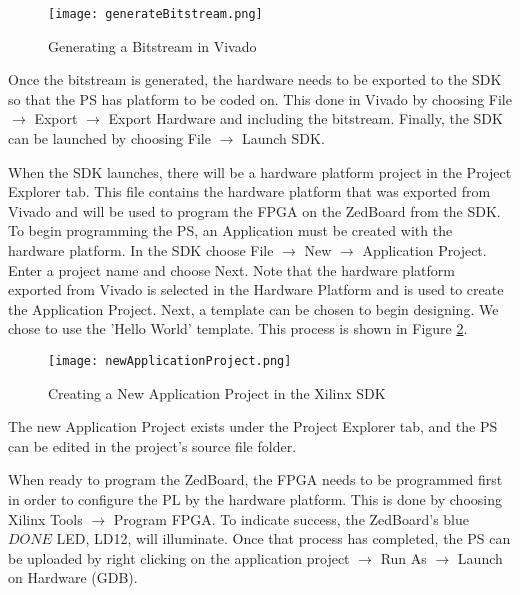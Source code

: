 \begin{figure}[H]
	\centerline{\texttt{[image: generateBitstream.png]}}
	\caption{Generating a Bitstream in Vivado}
	\label{generateBitstream}
\end{figure}

Once the bitstream is generated, the hardware needs to be exported to the SDK so that the PS has platform to be coded on. This done in Vivado by choosing File $\rightarrow$ Export $\rightarrow$ Export Hardware and including the bitstream. Finally, the SDK can be launched by choosing File $\rightarrow$ Launch SDK.
\par
When the SDK launches, there will be a hardware platform project in the Project Explorer tab. This file contains the hardware platform that was exported from Vivado and will be used to program the FPGA on the ZedBoard from the SDK. To begin programming the PS, an Application must be created with the hardware platform. In the SDK choose File $\rightarrow$ New $\rightarrow$ Application Project. Enter a project name and choose Next. Note that the hardware platform exported from Vivado is selected in the Hardware Platform and is used to create the Application Project. Next, a template can be chosen to begin designing. We chose to use the 'Hello World' template. This process is shown in Figure \ref{newApplicationProject}.

\begin{figure}[H]
	\centerline{\texttt{[image: newApplicationProject.png]}}
	\caption{Creating a New Application Project in the Xilinx SDK}
	\label{newApplicationProject}
\end{figure}

The new Application Project exists under the Project Explorer tab, and the PS can be edited in the project's source file folder.
\par
When ready to program the ZedBoard, the FPGA needs to be programmed first in order to configure the PL by the hardware platform. This is done by choosing Xilinx Tools $\rightarrow$ Program FPGA. To indicate success, the ZedBoard's blue $DONE$ LED, LD12, will illuminate. Once that process has completed, the PS can be uploaded by right clicking on the application project $\rightarrow$ Run As $\rightarrow$ Launch on Hardware (GDB).







